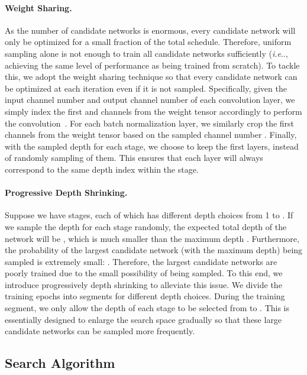 \documentclass[runningheads]{llncs}
\makeatletter
\DeclareRobustCommand\onedot{\futurelet\@let@token\@onedot}
\def\@onedot{\ifx\@let@token.\else.\null\fi\xspace}
\def\ie{\emph{i.e}\onedot} \def\Ie{\emph{I.e}\onedot}
\makeatother
\begin{document}
\paragraph{Weight Sharing.}

As the number of candidate networks is enormous, every candidate network will only be optimized for a small fraction of the total schedule. Therefore, uniform sampling alone is not enough to train all candidate networks sufficiently (\ie, achieving the same level of performance as being trained from scratch). To tackle this, we adopt the weight sharing technique so that every candidate network can be optimized at each iteration even if it is not sampled. Specifically, given the input channel number  and output channel number  of each convolution layer, we simply index the first  and  channels from the weight tensor accordingly to perform the convolution~\cite{guo2019single}. For each batch normalization layer, we similarly crop the first  channels from the weight tensor based on the sampled channel number . Finally, with the sampled depth  for each stage, we choose to keep the first  layers, instead of randomly sampling  of them. This ensures that each layer will always correspond to the same depth index within the stage.

\paragraph{Progressive Depth Shrinking.}

Suppose we have  stages, each of which has  different depth choices from 1 to . If we sample the depth  for each stage  randomly, the expected total depth of the network will be
,
which is much smaller than the maximum depth . Furthermore, the probability of the largest candidate network (with the maximum depth) being sampled is extremely small: . Therefore, the largest candidate networks are poorly trained due to the small possibility of being sampled. To this end, we introduce progressively depth shrinking to alleviate this issue. We divide the training epochs into  segments for  different depth choices. During the  training segment, we only allow the depth of each stage to be selected from  to . This is essentially designed to enlarge the search space gradually so that these large candidate networks can be sampled more frequently.

\subsection{Search Algorithm}
\end{document}
